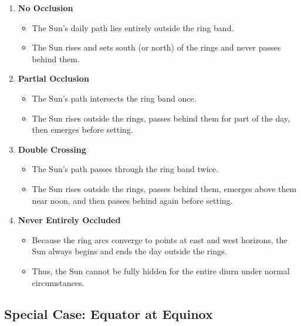 \documentclass[
  letterpaper,
]{book}
\providecommand{\tightlist}{%
  \setlength{\itemsep}{0pt}\setlength{\parskip}{0pt}}
\begin{document}
\begin{enumerate}
\def\labelenumi{\arabic{enumi}.}
\tightlist
\item
  \textbf{No Occlusion}

  \begin{itemize}
  \tightlist
  \item
    The Sun's daily path lies entirely outside the ring band.\\
  \item
    The Sun rises and sets south (or north) of the rings and never
    passes behind them.
  \end{itemize}
\item
  \textbf{Partial Occlusion}

  \begin{itemize}
  \tightlist
  \item
    The Sun's path intersects the ring band once.\\
  \item
    The Sun rises outside the rings, passes behind them for part of the
    day, then emerges before setting.
  \end{itemize}
\item
  \textbf{Double Crossing}

  \begin{itemize}
  \tightlist
  \item
    The Sun's path passes through the ring band twice.\\
  \item
    The Sun rises outside the rings, passes behind them, emerges above
    them near noon, and then passes behind again before setting.
  \end{itemize}
\item
  \textbf{Never Entirely Occluded}

  \begin{itemize}
  \tightlist
  \item
    Because the ring arcs converge to points at east and west horizons,
    the Sun always begins and ends the day outside the rings.\\
  \item
    Thus, the Sun cannot be fully hidden for the entire diurn under
    normal circumstances.
  \end{itemize}
\end{enumerate}

\subsection{\texorpdfstring{\textbf{Special Case: Equator at
Equinox}}{Special Case: Equator at Equinox}}\label{special-case-equator-at-equinox}
\end{document}
